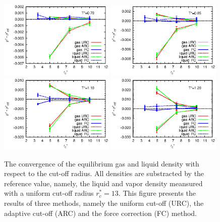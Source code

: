 \documentclass[aps,pre,preprint]{revtex4}
\begin{document}
\begin{figure}
  \centering
  \includegraphics[width=0.49\textwidth]{fig/converge/t0.70.eps} 
  \includegraphics[width=0.49\textwidth]{fig/converge/t0.85.eps} 
  \includegraphics[width=0.49\textwidth]{fig/converge/t1.10.eps} 
  \includegraphics[width=0.49\textwidth]{fig/converge/t1.20.eps} 
  \caption{The convergence of the equilibrium gas and liquid density
    with respect to the cut-off radius. All densities are substracted
    by the reference value, namely, the liquid and vapor density
    meansured with a uniform cut-off radius $r_c^\ast=13$. This figure
    presents the results of three methods, namely the uniform cut-off
    (URC), the adaptive cut-off (ARC) and the force correction (FC)
    method. }
  \label{fig:tmp5}
\end{figure}
\end{document}
